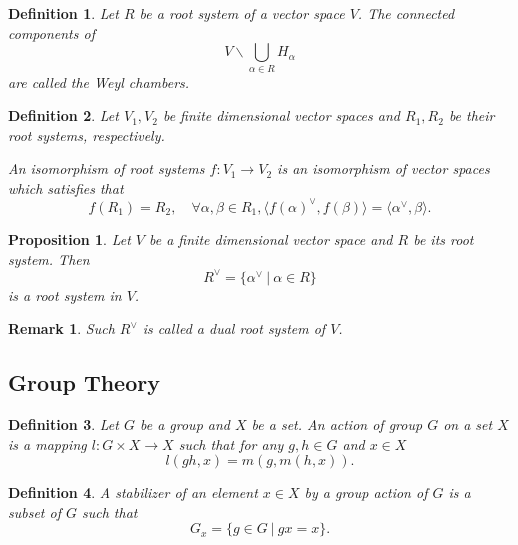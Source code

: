 \documentclass{article}
\newtheorem{proposition}{Proposition}[section]
\newtheorem{definition}{Definition}[section]
\newtheorem{remark}{Remark}[section]
\numberwithin{equation}{section}
\begin{document}
\begin{definition}
Let $R$ be a root system of a vector space $V$. The connected components of 
\begin{equation*}
V\backslash\bigcup_{\alpha\in R}H_\alpha
\end{equation*}
are called the Weyl chambers.
\end{definition}

\begin{definition}
Let $V_1,V_2$ be finite dimensional vector spaces and $R_1,R_2$ be their root systems, respectively.\\
\par An isomorphism of root systems $f:V_1\to V_2$ is an isomorphism of vector spaces which satisfies that 
\begin{equation*}
f(R_1) = R_2, \quad \forall \alpha,\beta\in R_1, \langle f(\alpha)^\lor,f(\beta)\rangle = \langle\alpha^\lor,\beta\rangle.%
\end{equation*}
\end{definition}

\begin{proposition}
Let $V$ be a finite dimensional vector space and $R$ be its root system. Then 
\begin{equation*}
R^\lor = \{\alpha^\lor\:|\: \alpha\in R\}
\end{equation*}
is a root system in $V$.
\end{proposition}

\begin{remark}
Such $R^\lor$ is called a dual root system of $V$.
\end{remark}

\subsection{Group Theory}

\begin{definition}
Let $G$ be a group and $X$ be a set. An action of group $G$ on a set $X$ is a mapping $l:G\times X\to X$ such that for any $g,h\in G$ and $x\in X$
\begin{equation*}
l(gh,x) = m(g,m(h,x)).
\end{equation*}
\end{definition}

\begin{definition}
A stabilizer of an element $x\in X$ by a group action of $G$ is a subset of $G$ such that
\begin{equation*}
G_x=\{g\in G\:|\: gx=x\}.
\end{equation*}
\end{definition}
\end{document}
